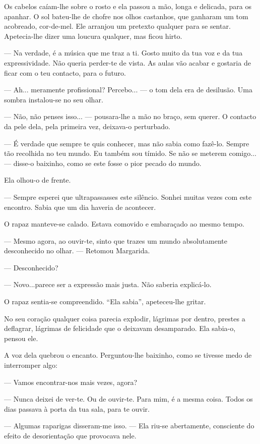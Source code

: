 Os cabelos caíam-lhe sobre o rosto e ela passou a mão, longa e delicada,
para os apanhar. O sol bateu-lhe de chofre nos olhos castanhos, que
ganharam um tom acobreado, cor-de-mel. Ele arranjou um pretexto qualquer
para se sentar. Apetecia-lhe dizer uma loucura qualquer, mas ficou
hirto.

--- Na verdade, é a música que me traz a ti. Gosto muito da tua voz e da
tua expressividade. Não queria perder-te de vista. As aulas vão acabar e
gostaria de ficar com o teu contacto, para o futuro.

--- Ah... meramente profissional? Percebo... --- o tom dela era de desilusão.
Uma sombra instalou-se no seu olhar.

--- Não, não penses isso... --- pousara-lhe a mão no braço, sem querer. O
contacto da pele dela, pela primeira vez, deixava-o perturbado.

--- É verdade que sempre te quis conhecer, mas não sabia como fazê-lo.
Sempre tão recolhida no teu mundo. Eu também sou tímido. Se não se
meterem comigo... --- disse-o baixinho, como se este fosse o pior pecado
do mundo.

Ela olhou-o de frente.

--- Sempre esperei que ultrapassasses este silêncio. Sonhei muitas vezes
com este encontro. Sabia que um dia haveria de acontecer.

O rapaz manteve-se calado. Estava comovido e embaraçado ao mesmo tempo.

--- Mesmo agora, ao ouvir-te, sinto que trazes um mundo absolutamente
desconhecido no olhar. ---  Retomou Margarida.

--- Desconhecido?

--- Novo...parece ser a expressão mais justa. Não saberia explicá-lo.

O rapaz sentia-se compreendido. ``Ela sabia'', apeteceu-lhe gritar.

No seu coração qualquer coisa parecia explodir, lágrimas por dentro,
prestes a deflagrar, lágrimas de felicidade que o deixavam desamparado.
Ela sabia-o, pensou ele.

A voz dela quebrou o encanto. Perguntou-lhe baixinho, como se tivesse
medo de interromper algo:

--- Vamos encontrar-nos mais vezes, agora?

--- Nunca deixei de ver-te. Ou de ouvir-te. Para mim, é a mesma coisa.
Todos os dias passava à porta da tua sala, para te ouvir.

--- Algumas raparigas disseram-me isso. --- Ela riu-se abertamente,
consciente do efeito de desorientação que provocava nele.

